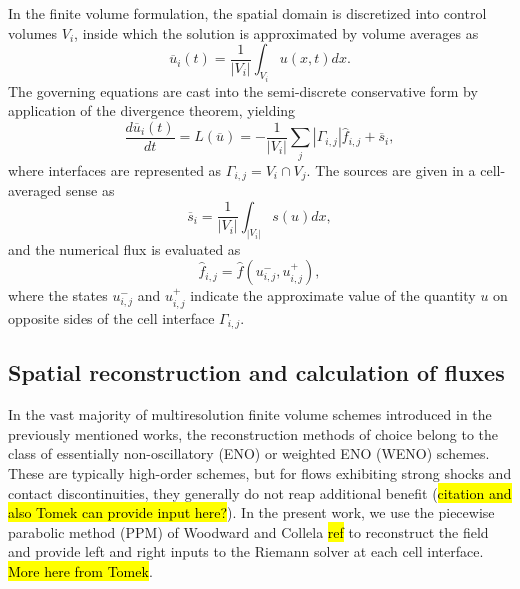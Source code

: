 \documentclass[]{article}
\begin{document}
    In the finite volume formulation, the spatial domain is discretized into
    control volumes $V_{i}$, inside which the solution is approximated by volume
    averages as
    \begin{equation}
        \overline{u}_{i}(t) = \frac{1}{|V_{i}|} \int_{V_{i}} u(x,t) dx.
    \end{equation}
    The governing equations are cast into the semi-discrete conservative form
    by application of the divergence theorem, yielding
    \begin{equation}
        \frac{d \overline{u}_{i}(t)}{dt} = L(\overline{u}) =  -\frac{1}{|V_{i}|} \sum_{j} |
        \Gamma_{i,j}| \hat{f}_{i,j}
        + \overline{s}_{i},
        \label{ode}
    \end{equation}
    where interfaces are represented as $\Gamma_{i,j} = V_{i} \cap
    V_{j}$. The sources are given in a cell-averaged sense as
    \begin{equation}
        \overline{s}_{i} = \frac{1}{|V_{i}|} \int_{|V_{i}|} s(u) dx,
    \end{equation}
    and the numerical flux is evaluated as
    \begin{equation}
        \hat{f}_{i,j} = \hat{f}(u^{-}_{i,j}, u^{+}_{i,j}),
        \label{flux}
    \end{equation}
    where the states $u^{-}_{i,j}$ and $u^{+}_{i,j}$ indicate the approximate
    value of the quantity $u$ on opposite sides of the cell
    interface $\Gamma_{i,j}$.

    \subsection{Spatial reconstruction and calculation of fluxes}

        In the vast majority of multiresolution finite volume schemes
        introduced in the previously mentioned works, the reconstruction
        methods of choice belong to the class of essentially non-oscillatory
        (ENO) or weighted ENO (WENO) schemes. These are typically
        high-order schemes, but for flows exhibiting strong shocks and
        contact discontinuities, they generally do not
        reap additional benefit (\hl{citation and also Tomek can provide input
        here?}). In the present work, we use the piecewise parabolic method
        (PPM) of Woodward and Collela \hl{ref} to reconstruct the field and
        provide left and right inputs to the Riemann solver at each cell
        interface. \hl{More here from Tomek}.
\end{document}
